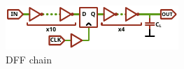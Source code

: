 
\begin{figure}[h]
	\centering
	\includegraphics[width=\columnwidth]{./figures/dff_ivx_chain_3.pdf}
	\caption{DFF chain}
	\label{dffchain}
\end{figure}
